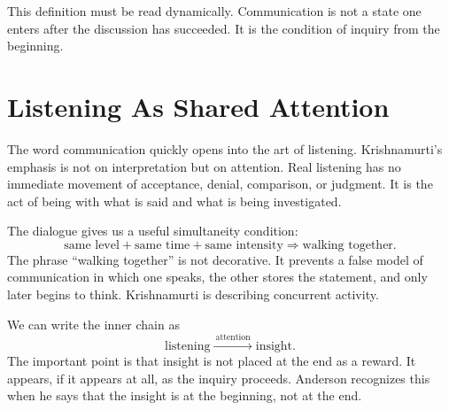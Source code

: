 This definition must be read dynamically. Communication is not a state one enters after the discussion has succeeded. It is the condition of inquiry from the beginning.

\section{Listening As Shared Attention}

The word communication quickly opens into the art of listening. Krishnamurti's emphasis is not on interpretation but on attention. Real listening has no immediate movement of acceptance, denial, comparison, or judgment. It is the act of being with what is said and what is being investigated.

The dialogue gives us a useful simultaneity condition:
\begin{equation}
\text{same level}
+
\text{same time}
+
\text{same intensity}
\Longrightarrow
\text{walking together}.
\end{equation}
The phrase ``walking together'' is not decorative. It prevents a false model of communication in which one speaks, the other stores the statement, and only later begins to think. Krishnamurti is describing concurrent activity.

We can write the inner chain as
\begin{equation}
\text{listening}
\xrightarrow{\ \text{attention}\ }
\text{insight}.
\end{equation}
The important point is that insight is not placed at the end as a reward. It appears, if it appears at all, as the inquiry proceeds. Anderson recognizes this when he says that the insight is at the beginning, not at the end.

\begin{figure}
\centering
{}
\end{figure}

